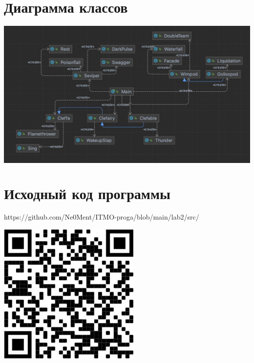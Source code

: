 \documentclass[12pt,onecolumn]{article}
\begin{document}
\section{Диаграмма классов}
\includegraphics[width=\columnwidth]{imgs/lab2diagram.png}

\section{Исходный код программы}
https://github.com/Ne0Ment/ITMO-proga/blob/main/lab2/src/
\begin{center}
  \includegraphics[width=7cm]{imgs/lab2qr.png}
\end{center}
\end{document}

